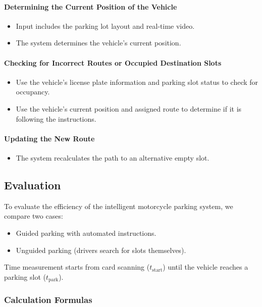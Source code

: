 \documentclass{article}
\begin{document}
\begin{itemize}[label=-]
    \paragraph{Determining the Current Position of the Vehicle}
    \begin{itemize}[label=-]
        \item Input includes the parking lot layout and real-time video.
        \item The system determines the vehicle's current position.
    \end{itemize}

    \paragraph{Checking for Incorrect Routes or Occupied Destination Slots}
    \begin{itemize}[label=-]
        \item Use the vehicle's license plate information and parking slot status to check for occupancy.
        \item Use the vehicle's current position and assigned route to determine if it is following the instructions.
    \end{itemize}

    \paragraph{Updating the New Route}
    \begin{itemize}[label=-]
        \item The system recalculates the path to an alternative empty slot.
    \end{itemize}
    \subsection{Evaluation}
    To evaluate the efficiency of the intelligent motorcycle parking system, we compare two cases:
    \begin{itemize}
    \item Guided parking with automated instructions.
    \item Unguided parking (drivers search for slots themselves).
    \end{itemize}

Time measurement starts from card scanning ($t_{\text{start}}$) until the vehicle reaches a parking slot ($t_{\text{park}}$).

    \subsubsection{Calculation Formulas}


\end{itemize}
\end{document}
